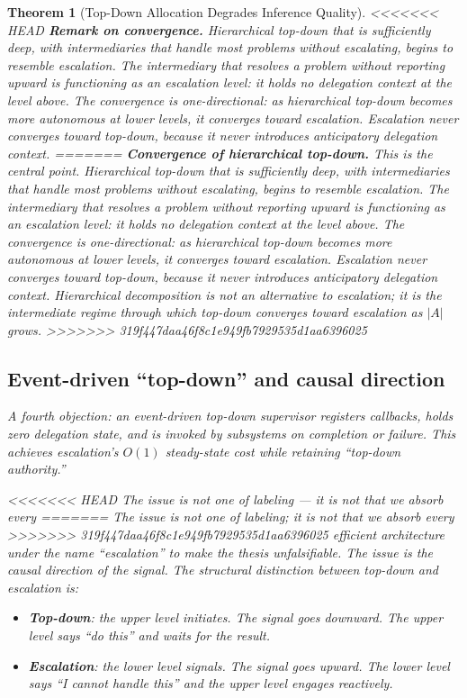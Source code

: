 \documentclass[11pt]{article}
\newtheorem{theorem}{Theorem}
\theoremstyle{definition}
\begin{document}
\begin{theorem}[Top-Down Allocation Degrades Inference Quality]
<<<<<<< HEAD
\textbf{Remark on convergence.} Hierarchical top-down that is
sufficiently deep, with intermediaries that handle most problems without
escalating, begins to \emph{resemble} escalation. The intermediary that
resolves a problem without reporting upward is functioning as an
escalation level: it holds no delegation context at the level above.
The convergence is one-directional: as hierarchical top-down becomes
more autonomous at lower levels, it converges toward escalation.
Escalation never converges toward top-down, because it never introduces
anticipatory delegation context.
=======
\textbf{Convergence of hierarchical top-down.} This is the central
point. Hierarchical top-down that is sufficiently deep, with
intermediaries that handle most problems without escalating, begins to
\emph{resemble} escalation. The intermediary that resolves a problem
without reporting upward is functioning as an escalation level: it
holds no delegation context at the level above. The convergence is
one-directional: as hierarchical top-down becomes more autonomous at
lower levels, it converges toward escalation. Escalation never
converges toward top-down, because it never introduces anticipatory
delegation context. Hierarchical decomposition is not an alternative
to escalation; it is the \emph{intermediate regime} through which
top-down converges toward escalation as $|A|$ grows.
>>>>>>> 319f447daa46f8c1e949fb7929535d1aa6396025

\subsection{Event-driven ``top-down'' and causal direction}

A fourth objection: an event-driven top-down supervisor registers
callbacks, holds zero delegation state, and is invoked by subsystems on
completion or failure. This achieves escalation's $O(1)$ steady-state
cost while retaining ``top-down authority.''

<<<<<<< HEAD
The issue is not one of labeling --- it is not that we absorb every
=======
The issue is not one of labeling; it is not that we absorb every
>>>>>>> 319f447daa46f8c1e949fb7929535d1aa6396025
efficient architecture under the name ``escalation'' to make the thesis
unfalsifiable. The issue is the \emph{causal direction of the signal}.
The structural distinction between top-down and escalation is:

\begin{itemize}
\item \textbf{Top-down}: the upper level initiates. The signal goes
   \emph{downward}. The upper level says ``do this'' and waits for the
   result.
\item \textbf{Escalation}: the lower level signals. The signal goes
   \emph{upward}. The lower level says ``I cannot handle this'' and the
   upper level engages reactively.
\end{itemize}


\end{theorem}
\end{document}
